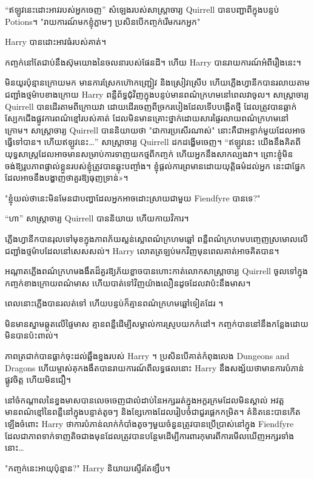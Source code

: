 “ឥឡូវ​នេះ​ដោះ​អាវ​របស់​អ្នក​ចេញ” សំឡេង​របស់​សាស្ត្រាចារ្យ Quirrell បាន​បញ្ជា​ពី​ក្នុង​បន្ទប់ Potions។ "រាយការណ៍មកខ្ញុំភ្លាមៗ ប្រសិនបើកញ្ចក់រើមករកអ្នក"

Harry បានដោះអាវធំរបស់គាត់។

កញ្ចក់នៅតែជាប់នឹងស៊ុមយោងនៃចលនារបស់ផែនដី។ ហើយ Harry បានរាយការណ៍អំពីរឿងនេះ។

មិនយូរប៉ុន្មានក្រោយមក មានការស្រែកហ៊ោកញ្ជ្រៀវ និងស្រៀវស្រើប ហើយភ្លើងហ្វានីកបានរលាយតាមជញ្ជាំងថ្មម៉ាបខាងក្រោយ Harry ពន្លឺព័ទ្ធជុំវិញក្នុងបន្ទប់មានពណ៌ក្រហមនៅពេលវាចូល។ សាស្ត្រាចារ្យ Quirrell បានដើរតាមពីក្រោយវា ដោយដើរចេញពីច្រករបៀងដែលទើបបង្កើតថ្មី ដែលត្រូវបានឆ្លាក់ ស្បែកជើងផ្លូវការពណ៌ខ្មៅរបស់គាត់ ដែលមិនមានគ្រោះថ្នាក់ដោយសារផ្ទៃរលាយពណ៌ក្រហមនៅក្រោម។ សាស្រ្តាចារ្យ Quirrell បាននិយាយថា "ជាការប្រសើរណាស់" នោះគឺជាអន្ទាក់មួយដែលអាចធ្វើទៅបាន។ ហើយឥឡូវនេះ…” សាស្ត្រាចារ្យ Quirrell ដកដង្ហើមចេញ។ “ឥឡូវនេះ យើងនឹងគិតពីយុទ្ធសាស្ត្រដែលអាចមានសម្រាប់ការទាញយកថ្មពីកញ្ចក់ ហើយអ្នកនឹងសាកល្បងវា។ ព្រោះខ្ញុំមិនចង់ឱ្យរូបភាពផ្ទាល់ខ្លួនរបស់ខ្ញុំត្រូវបានឆ្លុះបញ្ចាំង។ ខ្ញុំ​ផ្តល់​ការ​ព្រមាន​ដោយ​យុត្តិធម៌​ដល់​អ្នក នេះ​ជា​ផ្នែក​ដែល​អាច​នឹង​បង្ហាញ​ថា​គួរ​ឱ្យ​ធុញ​ទ្រាន់»។

"ខ្ញុំយល់ថានេះមិនមែនជាបញ្ហាដែលអ្នកអាចដោះស្រាយជាមួយ Fiendfyre បានទេ?"

“ហា” សាស្ត្រាចារ្យ Quirrell បាននិយាយ ហើយកាយវិការ។

ភ្លើងហ្វានីកបានរុលទៅមុខក្នុងភាពភ័យស្លន់ស្លោពណ៌ក្រហមឆ្អៅ ពន្លឺពណ៌ក្រហមបញ្ចេញស្រមោលលើជញ្ជាំងថ្មម៉ាបដែលនៅសេសសល់។ Harry លោតត្រឡប់មកវិញមុនពេលគាត់អាចគិតបាន។

អណ្តាតភ្លើងពណ៌ក្រហមងងឹតដ៏គួរឱ្យភ័យខ្លាចបានហោះកាត់លោកសាស្រ្តាចារ្យ Quirrell ចូលទៅក្នុងកញ្ចក់ខាងក្រោយពណ៌មាស ហើយបាត់ទៅវិញយ៉ាងលឿនដូចដែលវាប៉ះនឹងមាស។

ពេលនោះ​ភ្លើង​បាន​រលត់​ទៅ ហើយ​បន្ទប់​ក៏​គ្មាន​ពណ៌​ក្រហម​ឆ្អៅ​ទៀត​ដែរ ។

មិនមានស្នាមឆ្កូតលើផ្ទៃមាស គ្មានពន្លឺដើម្បីសម្គាល់ការស្រូបយកកំដៅ។ កញ្ចក់​បាន​នៅ​នឹង​កន្លែង​ដោយ​មិន​បាន​ប៉ះ​ពាល់។

ភាពត្រជាក់បានធ្លាក់ចុះដល់ឆ្អឹងខ្នងរបស់ Harry ។ ប្រសិនបើគាត់កំពុងលេង Dungeons and Dragons ហើយម្ចាស់គុកងងឹតបានរាយការណ៍ពីលទ្ធផលនោះ Harry នឹងសង្ស័យថាមានការបំភាន់ផ្លូវចិត្ត ហើយមិនជឿ។

នៅចំកណ្តាលនៃខ្នងមាសបានលេចចេញជាលំដាប់នៃអក្សររត់ក្នុងអក្ខរក្រមដែលមិនស្គាល់ អវត្តមានពណ៌ខ្មៅនៃពន្លឺនៅក្នុងបន្ទាត់តូចៗ និងខ្សែកោងដែលរៀបចំជាជួរផ្ដេកកម្រិត។ គំនិតនេះបានកើតឡើងចំពោះ Harry ថាការបំភាន់លាក់កំបាំងតូចៗមួយចំនួនត្រូវបានប្រើប្រាស់នៅក្នុង Fiendfyre ដែលជាភាពទាក់ទាញតិចជាងមុនដែលត្រូវបានបន្ថែមដើម្បីការពារកុមារពីការមើលឃើញអក្សរទាំងនោះ…

"កញ្ចក់នេះអាយុប៉ុន្មាន?" Harry និយាយស្ទើរតែខ្សឹប។

